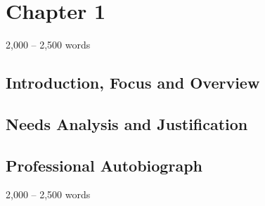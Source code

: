 \section{Chapter 1}
2,000 – 2,500 words
\subsection{Introduction, Focus and Overview}

\subsection{Needs Analysis and Justification}

\subsection{Professional Autobiograph}
2,000 – 2,500 words
